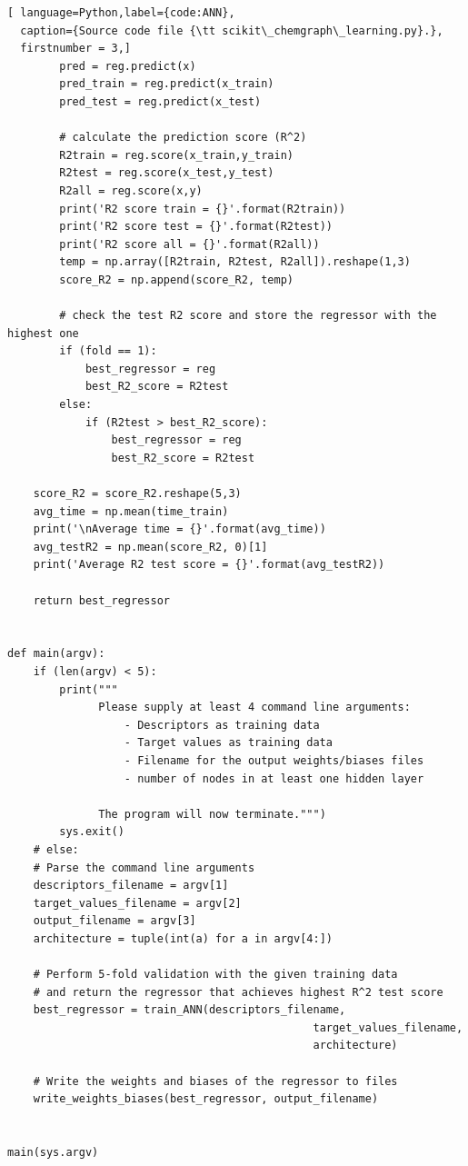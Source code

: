 \documentclass[11pt,titlepage,dvipdfmx,twoside]{article}
\begin{document}
\begin{lstlisting}[ language=Python,label={code:ANN},
  caption={Source code file {\tt scikit\_chemgraph\_learning.py}.},
  firstnumber = 3,]
        pred = reg.predict(x)
        pred_train = reg.predict(x_train)
        pred_test = reg.predict(x_test)
           
        # calculate the prediction score (R^2)
        R2train = reg.score(x_train,y_train)
        R2test = reg.score(x_test,y_test)
        R2all = reg.score(x,y) 
        print('R2 score train = {}'.format(R2train))
        print('R2 score test = {}'.format(R2test))
        print('R2 score all = {}'.format(R2all))
        temp = np.array([R2train, R2test, R2all]).reshape(1,3)
        score_R2 = np.append(score_R2, temp)
        
        # check the test R2 score and store the regressor with the highest one
        if (fold == 1):
            best_regressor = reg
            best_R2_score = R2test
        else:
            if (R2test > best_R2_score):
                best_regressor = reg
                best_R2_score = R2test

    score_R2 = score_R2.reshape(5,3)
    avg_time = np.mean(time_train)
    print('\nAverage time = {}'.format(avg_time))
    avg_testR2 = np.mean(score_R2, 0)[1]
    print('Average R2 test score = {}'.format(avg_testR2))
    
    return best_regressor


def main(argv):
    if (len(argv) < 5):
        print("""
              Please supply at least 4 command line arguments:
                  - Descriptors as training data
                  - Target values as training data
                  - Filename for the output weights/biases files
                  - number of nodes in at least one hidden layer
                  
              The program will now terminate.""")
        sys.exit()
    # else:
    # Parse the command line arguments
    descriptors_filename = argv[1]
    target_values_filename = argv[2]
    output_filename = argv[3]
    architecture = tuple(int(a) for a in argv[4:])
    
    # Perform 5-fold validation with the given training data
    # and return the regressor that achieves highest R^2 test score
    best_regressor = train_ANN(descriptors_filename,
                                               target_values_filename,
                                               architecture)
    
    # Write the weights and biases of the regressor to files
    write_weights_biases(best_regressor, output_filename)
    
    
main(sys.argv)
\end{lstlisting}
\end{document}
